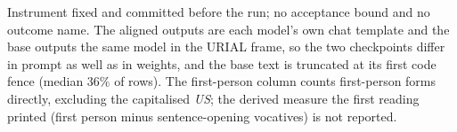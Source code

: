 Instrument fixed and committed before the run; no acceptance bound and no outcome name. The aligned outputs are each model's own chat template and the base outputs the same model in the URIAL frame, so the two checkpoints differ in prompt as well as in weights, and the base text is truncated at its first code fence (median $36\%$ of rows). The first-person column counts first-person forms directly, excluding the capitalised \emph{US}; the derived measure the first reading printed (first person minus sentence-opening vocatives) is not reported.